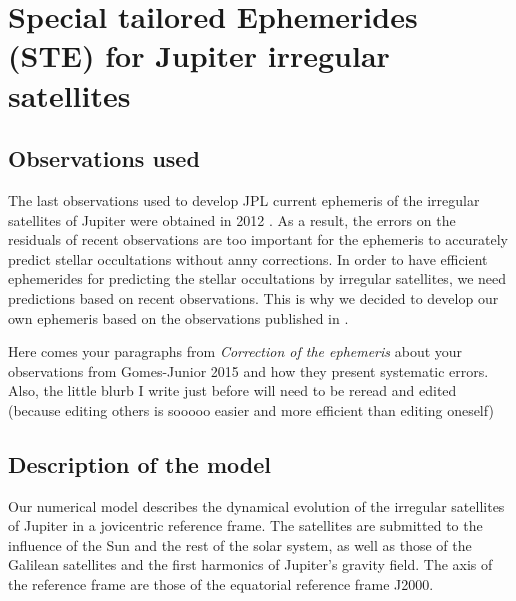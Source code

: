 \documentclass[traditabstract]{aa}
\begin{document}
\section{Special tailored Ephemerides (STE) for Jupiter irregular satellites}
\newpage
\subsection{Observations used}

 
The last observations used to develop JPL current ephemeris of the irregular satellites of Jupiter were obtained in 2012 \citep{Jacobson2012}. As a result, the errors on the residuals of recent observations are too important for the ephemeris to accurately predict stellar occultations without anny corrections. In order to have efficient ephemerides for predicting the stellar occultations by irregular satellites, we need predictions based on recent observations. This is why we decided to develop our own ephemeris based on the observations published in \cite{GomesJunior2015}.

{\color{red}Here comes your paragraphs from \emph{Correction of the ephemeris} about your observations from Gomes-Junior 2015 and how they present systematic errors. Also, the little blurb I write just before will need to be reread and edited (because editing others is sooooo easier and more efficient than editing oneself)}

\newpage
\subsection{Description of the model}


Our numerical model describes the dynamical evolution of the irregular satellites of Jupiter in a jovicentric reference frame. The satellites are submitted to the influence of the Sun and the rest of the solar system, as well as those of the Galilean satellites and the first harmonics of Jupiter's gravity field. The axis of the reference frame are those of the equatorial reference frame J2000. 
\end{document}
